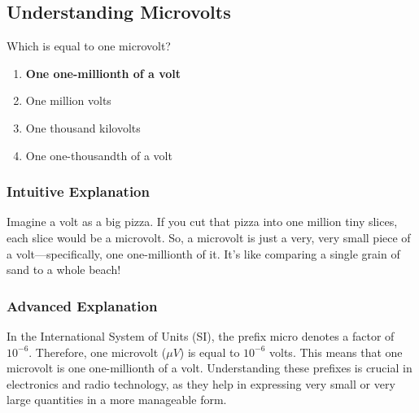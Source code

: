 \subsection{Understanding Microvolts}
\label{T5B04}

\begin{tcolorbox}[colback=gray!10!white,colframe=black!75!black,title=T5B04]
Which is equal to one microvolt?
\begin{enumerate}[noitemsep]
    \item \textbf{One one-millionth of a volt}
    \item One million volts
    \item One thousand kilovolts
    \item One one-thousandth of a volt
\end{enumerate}
\end{tcolorbox}

\subsubsection*{Intuitive Explanation}
Imagine a volt as a big pizza. If you cut that pizza into one million tiny slices, each slice would be a microvolt. So, a microvolt is just a very, very small piece of a volt—specifically, one one-millionth of it. It's like comparing a single grain of sand to a whole beach!

\subsubsection*{Advanced Explanation}
In the International System of Units (SI), the prefix micro denotes a factor of \(10^{-6}\). Therefore, one microvolt (\(\mu V\)) is equal to \(10^{-6}\) volts. This means that one microvolt is one one-millionth of a volt. Understanding these prefixes is crucial in electronics and radio technology, as they help in expressing very small or very large quantities in a more manageable form.
